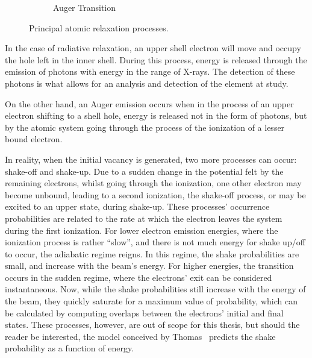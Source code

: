 \begin{figure}[h!]
\begin{subfigure}{0.49\textwidth}
        \caption{Auger Transition}
    \end{subfigure}
    \caption{Principal atomic relaxation processes.}
\end{figure}

In the case of radiative relaxation, an upper shell electron will move and occupy the hole left in the inner shell. During this process, energy is released through the emission of photons with energy in the range of X-rays. The detection of these photons is what allows for an analysis and detection of the element at study.

On the other hand, an Auger emission occurs when in the process of an upper electron shifting to a shell hole, energy is released not in the form of photons, but by the atomic system going through the process of the ionization of a lesser bound electron.


In reality, when the initial vacancy is generated, two more processes can occur: shake-off and shake-up. Due to a sudden change in the potential felt by the remaining electrons, whilst going through the ionization, one other electron may become unbound, leading to a second ionization, the shake-off process, or may be excited to an upper state, during shake-up. These processes' occurrence probabilities are related to the rate at which the electron leaves the system during the first ionization. For lower electron emission energies, where the ionization process is rather ``slow'', and there is not much energy for shake up/off to occur, the adiabatic regime reigns. In this regime, the shake probabilities are small, and increase with the beam's energy. For higher energies, the transition occurs in the sudden regime, where the electrons' exit can be considered instantaneous. Now, while the shake probabilities still increase with the energy of the beam, they quickly saturate for a maximum value of probability, which can be calculated by computing overlaps between the electrons' initial and final states. These processes, however, are out of scope for this thesis, but should the reader be interested, the model conceived by Thomas~\cite{Thomas_model} predicts the shake probability as a function of energy.

